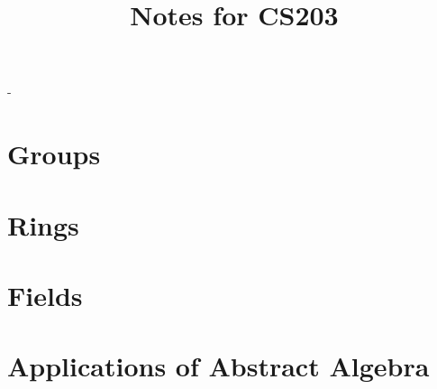 \documentclass[a4paper,12pt]{memoir}
\title{Notes for CS203}
\author{}
\date{}
\begin{document}
\frontmatter
\begin{titlingpage}
  \calccentering{\unitlength}
  \begin{adjustwidth*}{\unitlength}{-\unitlength}
    \setlength{\droptitle}{30pt}
    \maketitle
  \end{adjustwidth*}

\end{titlingpage}
\tableofcontents
\mainmatter
\chapter{Groups}

\chapter{Rings}

\chapter{Fields}

\chapter{Applications of Abstract Algebra}

\end{document}

